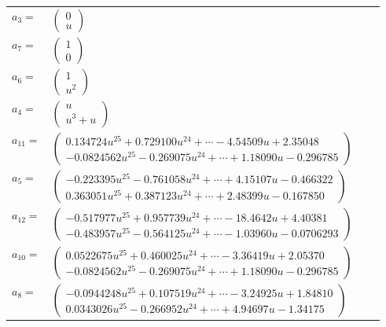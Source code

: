 \documentclass[1p]{elsarticle_modified}
\theoremstyle{definition}
\begin{document}
\begin{tabular}{m{7pt} m{180pt} m{7pt} m{180pt} }
\flushright $a_{3}=$&$\begin{pmatrix}0\\u\end{pmatrix}$ \\
\flushright $a_{7}=$&$\begin{pmatrix}1\\0\end{pmatrix}$ \\
\flushright $a_{6}=$&$\begin{pmatrix}1\\u^2\end{pmatrix}$ \\
\flushright $a_{4}=$&$\begin{pmatrix}u\\u^3+u\end{pmatrix}$ \\
\flushright $a_{11}=$&$\begin{pmatrix}0.134724 u^{25}+0.729100 u^{24}+\cdots-4.54509 u+2.35048\\-0.0824562 u^{25}-0.269075 u^{24}+\cdots+1.18090 u-0.296785\end{pmatrix}$ \\
\flushright $a_{5}=$&$\begin{pmatrix}-0.223395 u^{25}-0.761058 u^{24}+\cdots+4.15107 u-0.466322\\0.363051 u^{25}+0.387123 u^{24}+\cdots+2.48399 u-0.167850\end{pmatrix}$ \\
\flushright $a_{12}=$&$\begin{pmatrix}-0.517977 u^{25}+0.957739 u^{24}+\cdots-18.4642 u+4.40381\\-0.483957 u^{25}-0.564125 u^{24}+\cdots-1.03960 u-0.0706293\end{pmatrix}$ \\
\flushright $a_{10}=$&$\begin{pmatrix}0.0522675 u^{25}+0.460025 u^{24}+\cdots-3.36419 u+2.05370\\-0.0824562 u^{25}-0.269075 u^{24}+\cdots+1.18090 u-0.296785\end{pmatrix}$ \\
\flushright $a_{8}=$&$\begin{pmatrix}-0.0944248 u^{25}+0.107519 u^{24}+\cdots-3.24925 u+1.84810\\0.0343026 u^{25}-0.266952 u^{24}+\cdots+4.94697 u-1.34175\end{pmatrix}$ \\

\end{tabular}
\end{document}

